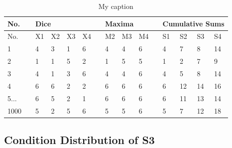 \documentclass[12pt]{article}
\begin{document}
\begin{table}[H]
\centering
\caption{My caption}
\label{my-label}
\begin{tabular}{|l|l|l|l|l|l|l|l|l|l|l|l|l|l|l|}
\hline
No.	&	&	\multicolumn{4}{l|}{Dice} &  & \multicolumn{3}{l|}{Maxima} &  & \multicolumn{4}{l|}{Cumulative Sums} \\ \hline
No.	&	& X1   & X2 & X3 & X4 &  & M2     & M3 & M4 &  & S1              & S2 & S3 & S4 \\ \hline
1 &	& 4    & 3  & 1  & 6  &  & 4      & 4  & 6  &  & 4               & 7  & 8  & 14 \\ \hline
2 &	& 1    & 1  & 5  & 2  &  & 1      & 5  & 5  &  & 1               & 2  & 7  & 9  \\ \hline
3 & & 4    & 1  & 3  & 6  &  & 4      & 4  & 6  &  & 4               & 5  & 8  & 14 \\ \hline
4 & & 6    & 6  & 2  & 2  &  & 6      & 6  & 6  &  & 6               & 12 & 14 & 16 \\ \hline
5...&  & 6    & 5  & 2  & 1  &  & 6      & 6  & 6  &  & 6               & 11 & 13 & 14 \\ \hline
1000& &5		& 2	& 5	& 6	& 	&5		&5	&6	&	&5					&7	&12	&18\\ \hline
\end{tabular}
\end{table}


\subsection{Condition Distribution of S3}
\end{document}

